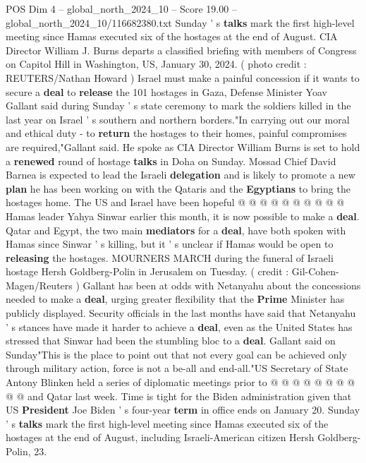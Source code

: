 \begin{textsample}{POS Dim 4 – global\_north\_2024\_10 – Score 19.00 – global\_north\_2024\_10/116682380.txt}  \label{ex:f4_pos_403}
Sunday ' s \textbf{talks} mark the first high-level meeting since Hamas executed six of the hostages at the end of August.
CIA Director William J.
Burns departs a classified briefing with members of Congress on Capitol Hill in Washington, US, January 30, 2024. ( photo credit : REUTERS/Nathan Howard ) Israel must make a painful concession if it wants to secure a \textbf{deal} to \textbf{release} the 101 hostages in Gaza, Defense Minister Yoav Gallant said during Sunday ' s state ceremony to mark the soldiers killed in the last year on Israel ' s southern and northern borders."In carrying out our moral and ethical duty - to \textbf{return} the hostages to their homes, painful compromises are required,"Gallant said.
He spoke as CIA Director William Burns is set to hold a \textbf{renewed} round of hostage \textbf{talks} in Doha on Sunday.
Mossad Chief David Barnea is expected to lead the Israeli \textbf{delegation} and is likely to promote a new \textbf{plan} he has been working on with the Qataris and the \textbf{Egyptians} to bring the hostages home.
The US and Israel have been hopeful @ @ @ @ @ @ @ @ @ @ Hamas leader Yahya Sinwar earlier this month, it is now possible to make a \textbf{deal}.
Qatar and Egypt, the two main \textbf{mediators} for a \textbf{deal}, have both spoken with Hamas since Sinwar ' s killing, but it ' s unclear if Hamas would be open to \textbf{releasing} the hostages.
MOURNERS MARCH during the funeral of Israeli hostage Hersh Goldberg-Polin in Jerusalem on Tuesday. ( credit : Gil-Cohen-Magen/Reuters ) Gallant has been at odds with Netanyahu about the concessions needed to make a \textbf{deal}, urging greater flexibility that the \textbf{Prime} Minister has publicly displayed.
Security officials in the last months have said that Netanyahu ' s stances have made it harder to achieve a \textbf{deal}, even as the United States has stressed that Sinwar had been the stumbling bloc to a \textbf{deal}.
Gallant said on Sunday"This is the place to point out that not every goal can be achieved only through military action, force is not a be-all and end-all."US Secretary of State Antony Blinken held a series of diplomatic meetings prior to @ @ @ @ @ @ @ @ @ @ and Qatar last week.
Time is tight for the Biden administration given that US \textbf{President} Joe Biden ' s four-year \textbf{term} in office ends on January 20.
Sunday ' s \textbf{talks} mark the first high-level meeting since Hamas executed six of the hostages at the end of August, including Israeli-American citizen Hersh Goldberg-Polin, 23.

\end{textsample}

